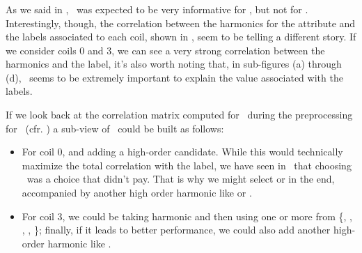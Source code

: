 \subsubsection{\cnmod}
As we said in , \cnmod\ was expected to be very informative for \qrp, but not for
\qlp. Interestingly, though, the correlation between the harmonics for the attribute and the labels
associated to each coil, shown in , seem to be telling a different story.
If we consider coils $0$ and $3$, we can see a very strong correlation between the harmonics and the
label, it's also worth noting that, in sub-figures (a) through (d), \cnmod[2]\ seems to be extremely
important to explain the value associated with the labels.

If we look back at the correlation matrix computed for \cnmod\ during the preprocessing for \qrp\
(cfr. ) a sub-view of \cnmod\ could be built as follows:
\begin{itemize}
	\item For coil $0$, \cnmod[2] and adding a high-order candidate. While this would technically maximize the total correlation with the label, we have seen in \qrp\ that choosing \cnmod[2]\ was a choice that didn't pay. That is why we might select \cnmod[3] or \cnmod[6] in the end, accompanied by another high order harmonic like \cnmod[9] or \cnmod[11].
	\item For coil $3$, we could be taking harmonic \cnmod[1] and then using one or more from
	      \{\cnmod[4], \cnmod[5], \cnmod[6], \cnmod[7], \cnmod[8]\}; finally, if it leads to
	      better performance, we could also add another high-order harmonic like \cnmod[10].
\end{itemize}
